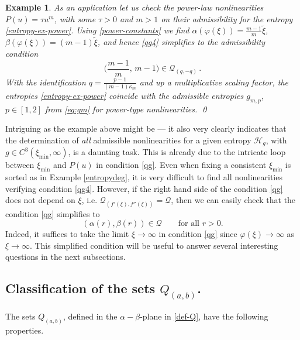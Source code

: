 \documentclass[reqno]{amsart}
\newtheorem{example}[lemma]{Example}
\begin{document}
\begin{example}
As an application let us check the power-law nonlinearities  $P(u)=\tau u^m$, with some $\tau>0$ and $m>1$ on their admissibility for the entropy \eqref{entropy-ex-power}. Using \eqref{power-constants} we find $\alpha(\varphi(\xi))=\frac{m-1}{m}\tilde\xi$, $\beta(\varphi(\xi))=(m-1)\tilde\xi$, and hence \eqref{qg4} simplifies to the admissibility condition 
$$
  \Big(\frac{m-1}{m},\,m-1\Big) \in\mathcal Q_{(q,-q)}\,.
$$
With the identification $q=\frac{p-1}{(m-1)\kappa_m}$ and up a multiplicative scaling factor, the entropies \eqref{entropy-ex-power} coincide with the admissible entropies $g_{m,p}$, $p\in[1,2]$ from \eqref{eq:gm} for power-type nonlinearities.
\qed
\end{example}
%
Intriguing as the example above might be --- it also very clearly indicates that the determination of \emph{all} admissible nonlinearities for a given entropy $\mathcal H_g$, with $g\in C^3(\xi_{\min},\infty)$, is a daunting task. This is already due to the intricate loop between $\xi_{\min}$ and $P(u)$ in condition \eqref{qg}. Even when fixing a consistent $\xi_{\min}$ is sorted as in Example \ref{entropydeg}, it is very difficult to find all nonlinearities verifying condition \eqref{qg4}. However, if the right hand side of the condition \eqref{qg} does not depend on $\xi$, i.e. $\mathcal{Q}_{(f'(\xi),f''(\xi))}=\mathcal{Q}$, then we can easily check that the condition \eqref{qg} simplifies to
\begin{equation}\label{qg2}
 (\alpha(r),\beta(r))\in\mathcal{Q} \qquad \mbox{for all } r>0  .
\end{equation}
Indeed, it suffices to take the limit $\xi\to\infty$ in condition \eqref{qg} since $\varphi(\xi)\to\infty$ as $\xi\to\infty$. This simplified condition will be useful to answer several interesting questions in the next subsections.


\subsection{Classification of the sets $Q_{(a,b)}$.}

The sets $Q_{(a,b)}$, defined in the $\alpha-\beta$-plane in \eqref{def-Q}, have the following properties.
\end{document}
